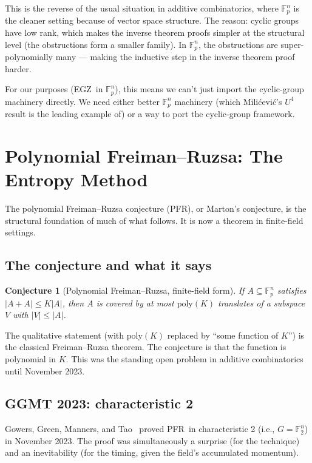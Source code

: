 \documentclass[11pt,a4paper]{article}
\theoremstyle{plain}
\newtheorem{conjecture}[theorem]{Conjecture}
\theoremstyle{definition}
\theoremstyle{remark}
\newcommand{\F}{\mathbb{F}}
\newcommand{\poly}{\mathrm{poly}}
\newcommand{\PFR}{\textsf{PFR}}
\newcommand{\EGZ}{\textsf{EGZ}}
\begin{document}
This is the reverse of the usual situation in additive combinatorics, where $\F_p^n$ is the cleaner setting because of vector space structure. The reason: cyclic groups have low rank, which makes the inverse theorem proofs simpler at the structural level (the obstructions form a smaller family). In $\F_p^n$, the obstructions are super-polynomially many --- making the inductive step in the inverse theorem proof harder.

For our purposes (\EGZ\ in $\F_p^n$), this means we can't just import the cyclic-group machinery directly. We need either better $\F_p^n$ machinery (which Milićević's $U^4$ result is the leading example of) or a way to port the cyclic-group framework.

\section{Polynomial Freiman--Ruzsa: The Entropy Method}

The polynomial Freiman--Ruzsa conjecture (\PFR), or Marton's conjecture, is the structural foundation of much of what follows. It is now a theorem in finite-field settings.

\subsection{The conjecture and what it says}

\begin{conjecture}[Polynomial Freiman--Ruzsa, finite-field form]
If $A \subseteq \F_p^n$ satisfies $|A + A| \leq K|A|$, then $A$ is covered by at most $\poly(K)$ translates of a subspace $V$ with $|V| \leq |A|$.
\end{conjecture}

The qualitative statement (with $\poly(K)$ replaced by ``some function of $K$'') is the classical Freiman--Ruzsa theorem. The conjecture is that the function is polynomial in $K$. This was the standing open problem in additive combinatorics until November 2023.

\subsection{GGMT 2023: characteristic 2}

Gowers, Green, Manners, and Tao~\cite{ggmt2023} proved \PFR\ in characteristic 2 (i.e., $G = \F_2^n$) in November 2023. The proof was simultaneously a surprise (for the technique) and an inevitability (for the timing, given the field's accumulated momentum).
\end{document}
